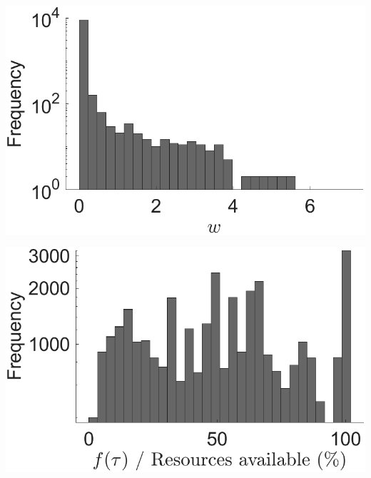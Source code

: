 \documentclass[utf8]{FrontiersinHarvard} %
\begin{document}
\begin{subfigure}
\begin{minipage}[b]{0.32\textwidth}
        \caption{}
        \label{figs:results:firing_rate_change}
    \end{minipage}%
\setcounter{figure}{2}
\setcounter{subfigure}{3}
    \begin{minipage}[b]{0.32\textwidth}
        \includegraphics[width=\linewidth]{rbSTDP/weights_E2E_histogram}
        \caption{}
        \label{figs:results:weight_distribution}
    \end{minipage}%
\setcounter{figure}{2}
\setcounter{subfigure}{4}
    \begin{minipage}[b]{0.32\textwidth}
        \includegraphics[width=\linewidth]{rbSTDP/non_potentiable_histogram}
        \caption{}
        \label{figs:results:non_potentiable}
    \end{minipage}%
\setcounter{figure}{2}
\setcounter{subfigure}{5}
    \begin{minipage}[b]{0.32\textwidth}

\end{minipage}
\end{subfigure}
\end{document}

